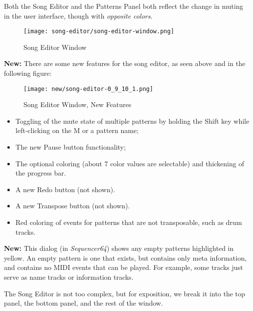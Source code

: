    Both the Song Editor and the Patterns Panel both reflect the change in
   muting in the user interface, though with \textsl{opposite colors}.

\begin{figure}[H]
   \centering 
   \texttt{[image: song-editor/song-editor-window.png]}
   \caption{Song Editor Window}
   \label{fig:song_editor_window}
\end{figure}

   \textbf{New:}
   There are some new features for the song editor, as
   seen above and in the following figure:

\begin{figure}[H]
   \centering 
   \texttt{[image: new/song-editor-0\_9\_10\_1.png]}
   \caption{Song Editor Window, New Features}
   \label{fig:song_editor_window_new_features}
\end{figure}

   \begin{itemize}
      \item Toggling of the mute state of multiple patterns by holding the
         Shift key while left-clicking on the M or a pattern name;
      \item The new Pause button functionality;
      \item The optional coloring (about 7 color values are selectable)
         and thickening of the progress bar.
      \item A new Redo button (not shown).
      \item A new Transpose button (not shown).
      \item Red coloring of events for patterns that are not transposable, such
         as drum tracks.
   \end{itemize}

   \textbf{New:} 
   This dialog (in \textsl{Sequencer64}) shows any empty patterns
   highlighted in yellow.  An empty pattern is one that exists, but
   contains only meta information, and contains no MIDI events that
   can be played.  For example, some tracks just serve as name tracks or
   information tracks.
   
   The Song Editor is not too complex, but for exposition, we break it into
   the top panel, the bottom panel, and the rest of the window.

